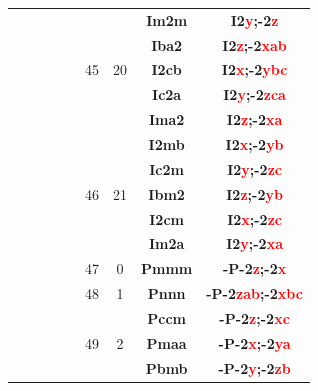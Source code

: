 \documentclass{article}      %
\begin{document}
\begin{small}
\begin{longtable}[c]{|c|c|c|c|c|c|c|c|c|}
          &  & & & &  & &\textbf{Im2m}         &\textbf{I2\textcolor{red}{y};-2\textcolor{red}{z}}\\\cline{6-9}           
          &  & & & &  & &\textbf{Iba2}         &\textbf{I2\textcolor{red}{z};-2\textcolor{red}{xab}}\\\cline{8-9}         
	  &  & & & &\textrm{45}  &\textrm{20} &\textbf{I2cb}         &\textbf{I2\textcolor{red}{x};-2\textcolor{red}{ybc}}\\\cline{8-9}         
          &  & & & &  & &\textbf{Ic2a}         &\textbf{I2\textcolor{red}{y};-2\textcolor{red}{zca}}\\\cline{8-9}         
          &  & & & &  & &\textbf{Ima2}         &\textbf{I2\textcolor{red}{z};-2\textcolor{red}{xa}}\\\cline{6-9}          
          &  & & & &  & &\textbf{I2mb}         &\textbf{I2\textcolor{red}{x};-2\textcolor{red}{yb}}\\\cline{8-9}          
          &  & & & & & &\textbf{Ic2m}         &\textbf{I2\textcolor{red}{y};-2\textcolor{red}{zc}}\\\cline{8-9}          
	  &  & & & &\textrm{46}  &\textrm{21} &\textbf{Ibm2}         &\textbf{I2\textcolor{red}{z};-2\textcolor{red}{yb}}\\\cline{8-9}          
          &  & & & &  & &\textbf{I2cm}         &\textbf{I2\textcolor{red}{x};-2\textcolor{red}{zc}}\\\cline{8-9}          
          &  & & & &  & &\textbf{Im2a}         &\textbf{I2\textcolor{red}{y};-2\textcolor{red}{xa}}\\\cline{2-9}          
	  &  & & & &\textrm{47}  &\textrm{0} &\textbf{Pmmm}         &\textbf{-P-2\textcolor{red}{z};-2\textcolor{red}{x}}\\\cline{6-9}         
 	  &  & & & &\textrm{48}  &\textrm{1} &\textbf{Pnnn}         &\textbf{-P-2\textcolor{red}{zab};-2\textcolor{red}{xbc}}\\\cline{6-9}     
          &  & & & &  & &\textbf{Pccm}         &\textbf{-P-2\textcolor{red}{z};-2\textcolor{red}{xc}}\\\cline{8-9}        
	  &  & & & &\textrm{49}  &\textrm{2} &\textbf{Pmaa}         &\textbf{-P-2\textcolor{red}{x};-2\textcolor{red}{ya}}\\\cline{8-9}        
          &  & & & &  & &\textbf{Pbmb}         &\textbf{-P-2\textcolor{red}{y};-2\textcolor{red}{zb}}\\\cline{6-9}        

\end{longtable}
\end{small}
\end{document}
